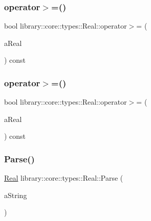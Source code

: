 \mbox{\label{classlibrary_1_1core_1_1types_1_1_real_a5046bc6db8251a1d3ac5bbc43f07db5d}} 
\subsubsection{\texorpdfstring{operator$>$=()}{operator>=()}\hspace{0.1cm}{\footnotesize\ttfamily [1/2]}}
{\footnotesize\ttfamily bool library\+::core\+::types\+::\+Real\+::operator$>$= (\begin{DoxyParamCaption}\item[{const \hyperlink{classlibrary_1_1core_1_1types_1_1_real}{Real} \&}]{a\+Real }\end{DoxyParamCaption}) const}

\mbox{\label{classlibrary_1_1core_1_1types_1_1_real_aa36e6de2ef7bc2d234be64417d36013d}} 
\subsubsection{\texorpdfstring{operator$>$=()}{operator>=()}\hspace{0.1cm}{\footnotesize\ttfamily [2/2]}}
{\footnotesize\ttfamily bool library\+::core\+::types\+::\+Real\+::operator$>$= (\begin{DoxyParamCaption}\item[{const \hyperlink{classlibrary_1_1core_1_1types_1_1_real_a9c5c8826b7e5a8e39544d23fea6c0e1c}{Real\+::\+Value\+Type} \&}]{a\+Real }\end{DoxyParamCaption}) const}

\mbox{\label{classlibrary_1_1core_1_1types_1_1_real_a7ec624abaddba3a9cabf094a6a69f484}} 
\subsubsection{\texorpdfstring{Parse()}{Parse()}}
{\footnotesize\ttfamily \hyperlink{classlibrary_1_1core_1_1types_1_1_real}{Real} library\+::core\+::types\+::\+Real\+::\+Parse (\begin{DoxyParamCaption}\item[{const \hyperlink{classlibrary_1_1core_1_1types_1_1_string}{types\+::\+String} \&}]{a\+String }\end{DoxyParamCaption})\hspace{0.3cm}{\ttfamily [static]}}


